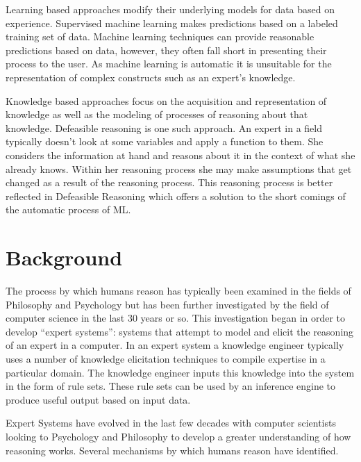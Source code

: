 Learning based approaches modify their underlying models for data based on experience. Supervised machine learning makes predictions based on a labeled training set of data. Machine learning techniques can provide reasonable predictions based on data, however, they often fall short in presenting their process to the user. As machine learning is automatic it is unsuitable for the representation of complex constructs such as an expert's knowledge.

Knowledge based approaches focus on the acquisition and representation of knowledge as well as the modeling of processes of reasoning about that knowledge. Defeasible reasoning is one such approach. An expert in a field typically doesn't look at some variables and apply a function to them. She considers the information at hand and reasons about it in the context of what she already knows. Within her reasoning process she may make assumptions that get changed as a result of the reasoning process. This reasoning process is better reflected in Defeasible Reasoning which offers a solution to the short comings of the automatic process of ML.


\section{Background}

The process by which humans reason has typically been examined in the fields of Philosophy and Psychology but has been further investigated by the field of computer science in the last 30 years or so. This investigation began in order to develop ``expert systems'': systems that attempt to model and elicit the reasoning of an expert in a computer. In an expert system a knowledge engineer typically uses a number of knowledge elicitation techniques to compile expertise in a particular domain. The knowledge engineer inputs this knowledge into the system in the form of rule sets. These rule sets can be used by an inference engine to produce useful output based on input data. 

Expert Systems have evolved in the last few decades with computer scientists looking to Psychology and Philosophy to develop a greater understanding of how reasoning works. Several mechanisms by which humans reason have identified.

